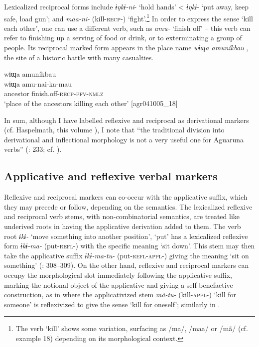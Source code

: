 \documentclass[output=paper]{langscibook}
\begin{document}
Lexicalized reciprocal forms include \textit{ɨŋkɨ-ni}{}- ‘hold hands’ < \textit{ɨŋkɨ}{}- ‘put away, keep safe, load gun’; and \textit{maa-ni-} (kill-\textsc{recp-}) ‘fight’.\footnote{The verb ‘kill’ shows some variation, surfacing as /ma/, /maa/ or /mã/ (cf. example 18) depending on its morphological context.} In order to express the sense ‘kill each other’, one can use a different verb, such as \textit{amu-} ‘finish off’ – this verb can refer to finishing up a serving of food or drink, or to exterminating a group of people. Its reciprocal marked form appears in the place name \textit{wɨɰa amuníkbau} , the site of a historic battle with many casualties.

\ea%
    \label{ex:overall:17}
    \glll wɨɰa amuníkbau\\
  wɨɰa  amu-nai-ka-mau\\
  ancestor  finish.off-\textsc{recp-pfv-nmlz}\\
  \glt  ‘place of the ancestors killing each other’ [agr041005\_18]
\z

In sum, although I have labelled reflexive and reciprocal as derivational markers (cf. Haspelmath, this volume ), I note that “the traditional division into derivational and inflectional morphology is not a very useful one for Aguaruna verbs” (\citealt{Overall2017}: 233; cf. \citealt{Plungian2001}).

\subsection{Applicative and reflexive verbal markers}
\label{sec:overall:3.1}
Reflexive and reciprocal markers can co-occur with the applicative suffix, which they may precede or follow, depending on the semantics. The lexicalized reflexive and reciprocal verb stems, with non-combinatorial semantics, are treated like underived roots in having the applicative derivation added to them. The verb root \textit{ɨkɨ-} ‘move something into another position’, ‘put’ has a lexicalized reflexive form \textit{ɨkɨ-ma-} (put-\textsc{refl-)} with the specific meaning ‘sit down’. This stem may then take the applicative suffix \textit{ɨkɨ-ma-tu-} (put-\textsc{refl-appl-)} giving the meaning ‘sit on something’ (\citealt{Overall2017}: 308–309). On the other hand, reflexive and reciprocal markers can occupy the morphological slot immediately following the applicative suffix, marking the notional object of the applicative and giving a self-benefactive construction, as in  where the applicativized stem \textit{mã-tu-} (kill-\textsc{appl-)} \textsc{‘}kill for someone’ is reflexivized to give the
sense ‘kill for oneself’; similarly in .
\end{document}
